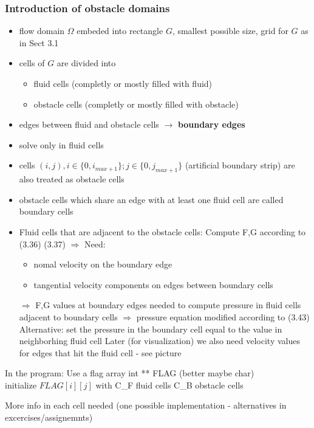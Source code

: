 \documentclass[a4paper,11pt]{scrartcl}
\begin{document}
\subsubsection{Introduction of obstacle domains}
\begin{itemize}
	\item flow domain $\Omega$ embeded into rectangle $G$, smallest possible size, grid for $G$ as in Sect 3.1 %
	\item cells of $G$ are divided into
	\begin{itemize}
		\item fluid cells (completly or mostly filled with fluid)
		\item obstacle cells (completly or mostly filled with obstacle)
	\end{itemize}
	\item edges between fluid and obstacle cells $\rightarrow$ \textbf{boundary edges}
	\item solve only in fluid cells
	\item cells $(i,j), i \in \{0, i_{max+1}\}; j \in \{0,j_{max+1}\}$
	(artificial boundary strip) are also treated as obstacle cells
	\item obstacle cells which share an edge with at least one fluid cell are called boundary cells
	\item Fluid cells that are adjacent to the obstacle cells: Compute F,G according to (3.36) (3.37)%
	$\Rightarrow$ Need: 
	\begin{itemize}
		\item nomal velocity on the boundary edge
		\item tangential velocity components on edges between boundary cells
	\end{itemize}
	\item[$\Rightarrow$] F,G values at boundary edges needed to compute pressure in fluid cells adjacent to boundary cells $\Rightarrow$ pressure equation modified according to (3.43) %
	Alternative: set the pressure in the boundary cell equal to the value in neighborhing fluid cell
	Later (for visualization) we also need velocity values for edges that hit the fluid cell - see picture %
\end{itemize}

In the program: Use a flag array int ** FLAG (better maybe char)\\
initialize $FLAG[i][j]$ with C\_F fluid cells
C\_B obstacle cells

More info in each cell needed (one possible implementation - alternatives in excercises/assignemnts)
\end{document}
